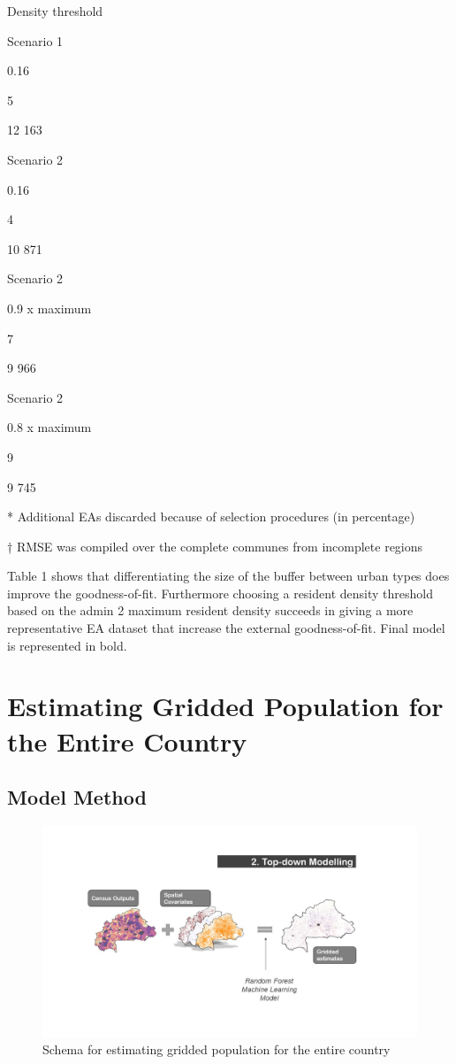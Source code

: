 \documentclass[]{book}
\begin{document}
Density threshold

Scenario 1

0.16

5

12 163

Scenario 2

0.16

4

10 871

Scenario 2

0.9 x maximum

7

9 966

Scenario 2

0.8 x maximum

9

9 745

* Additional EAs discarded because of selection procedures (in
percentage)

† RMSE was compiled over the complete communes from incomplete regions

Table 1 shows that differentiating the size of the buffer between urban
types does improve the goodness-of-fit. Furthermore choosing a resident
density threshold based on the admin 2 maximum resident density succeeds
in giving a more representative EA dataset that increase the external
goodness-of-fit. Final model is represented in bold.

\clearpage

\section{Estimating Gridded Population for the Entire
Country}\label{estimating-gridded-population-for-the-entire-country}

\subsection{Model Method}\label{model-method-1}

\begin{figure}

{\centering \includegraphics[width=1\linewidth]{dat/BFAv1/schema2_ENG} 

}

\caption{Schema for estimating gridded population for the entire country}\label{fig:schema2}
\end{figure}
\end{document}
